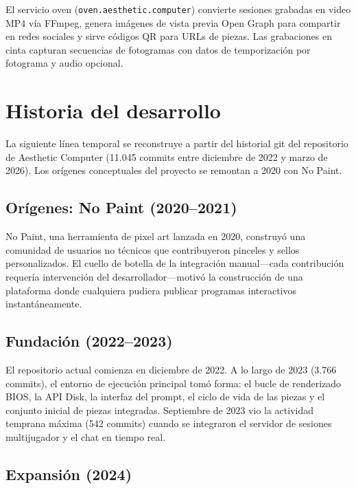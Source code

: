 \documentclass[10pt,letterpaper,twocolumn]{article}
\begin{document}
El servicio oven (\texttt{oven.aesthetic.computer}) convierte sesiones grabadas en video MP4 vía FFmpeg, genera imágenes de vista previa Open Graph para compartir en redes sociales y sirve códigos QR para URLs de piezas. Las grabaciones en cinta capturan secuencias de fotogramas con datos de temporización por fotograma y audio opcional.


\section{Historia del desarrollo}
\label{sec:history}

La siguiente línea temporal se reconstruye a partir del historial git del repositorio de Aesthetic Computer (11.045 commits entre diciembre de 2022 y marzo de 2026). Los orígenes conceptuales del proyecto se remontan a 2020 con No Paint.

\subsection{Orígenes: No Paint (2020--2021)}

No Paint, una herramienta de pixel art lanzada en 2020, construyó una comunidad de usuarios no técnicos que contribuyeron pinceles y sellos personalizados. El cuello de botella de la integración manual---cada contribución requería intervención del desarrollador---motivó la construcción de una plataforma donde cualquiera pudiera publicar programas interactivos instantáneamente.

\subsection{Fundación (2022--2023)}

El repositorio actual comienza en diciembre de 2022. A lo largo de 2023 (3.766 commits), el entorno de ejecución principal tomó forma: el bucle de renderizado BIOS, la API Disk, la interfaz del prompt, el ciclo de vida de las piezas y el conjunto inicial de piezas integradas. Septiembre de 2023 vio la actividad temprana máxima (542 commits) cuando se integraron el servidor de sesiones multijugador y el chat en tiempo real.

\subsection{Expansión (2024)}
\end{document}
